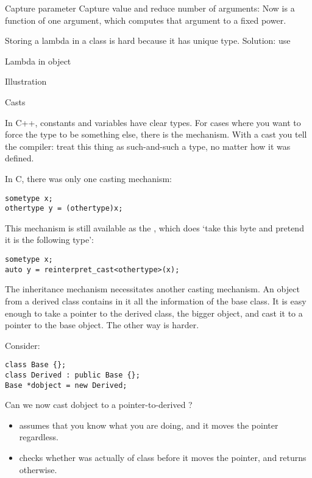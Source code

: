 \begin{slide}{Capture parameter}
  \label{sl:lambda-capture}
  Capture value and reduce number of arguments:
  Now  is a function of one argument, which computes
  that argument to a fixed power.
\end{slide}

Storing a lambda in a class is hard because it has unique
type. Solution: use 

\begin{block}{Lambda in object}
  \label{sl:lambda-class}
\end{block}

\begin{block}{Illustration}
  \label{sl:lambda-classed}
\end{block}

 {Casts}
\label{sec:cast}

In C++, constants and variables have clear types. For cases where you
want to force the type to be something else, there is the
 mechanism. With a cast you tell the compiler:
treat this thing as such-and-such a type, no matter how it was
defined.

In C, there was only one casting mechanism:
\begin{verbatim}
sometype x;
othertype y = (othertype)x;
\end{verbatim}
This mechanism is still available as the
, which does `take this byte and pretend
it is the following type':
\begin{verbatim}
sometype x;
auto y = reinterpret_cast<othertype>(x);
\end{verbatim}

The inheritance mechanism necessitates another casting mechanism.
An object from a derived class contains in it all the information of
the base class. It is easy enough to take a pointer to the derived
class, the bigger object, and cast it to a pointer to the base object.
The other way is harder.

Consider:
\begin{verbatim}
class Base {};
class Derived : public Base {};
Base *dobject = new Derived;
\end{verbatim}
Can we now cast dobject to a pointer-to-derived ?
\begin{itemize}
\item {} assumes that you know what you are
  doing, and it moves the pointer regardless.
\item {} checks whether  was
  actually of class  before it moves the pointer, and
  returns  otherwise.
\end{itemize}

